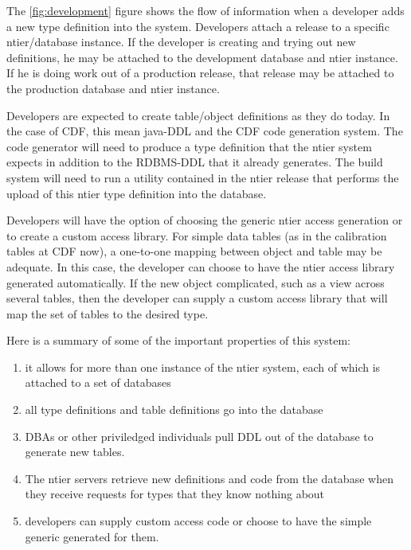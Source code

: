 The \ref{fig:development} figure shows the flow of information when
a developer adds a new type definition into the system. Developers
attach a release to a specific ntier/database instance.  If the
developer is creating and trying out new definitions, he may be
attached to the development database and ntier instance.  If he
is doing work out of a production release, that release may be
attached to the production database and ntier instance.

Developers are expected to create table/object definitions as they
do today.  In the case of CDF, this mean java-DDL and the CDF code
generation system.  The code generator will need to produce a 
type definition that the ntier system expects in addition to the 
RDBMS-DDL that it already generates.  The build system will need to
run a utility contained in the ntier release that performs the upload
of this ntier type definition into the database.

Developers will have the option of choosing the generic ntier access
generation or to create a custom access library.  For simple data tables
(as in the calibration tables at CDF now), a one-to-one mapping between
object and table may be adequate.  In this case, the developer can choose
to have the ntier access library generated automatically.  If the
new object complicated, such as a view across several tables, then the
developer can supply a custom access library that will map the set of
tables to the desired type.

Here is a summary of some of the important properties of this system:
\begin{enumerate}
\item it allows for more than one instance of the ntier system, each
of which is attached to a set of databases
\item all type definitions and table definitions go into the database
\item DBAs or other priviledged individuals pull DDL out of the database
to generate new tables.
\item The ntier servers retrieve new definitions and code from the database
when they receive requests for types that they know nothing about
\item developers can supply custom access code or choose to have 
the simple generic generated for them.
\end{enumerate}








